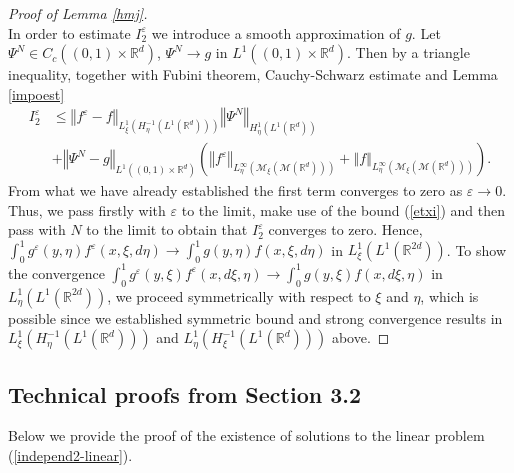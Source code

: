 \documentclass[10pt]{article}
\newcommand*{\norm}[1]{\left\Vert{#1}\right\Vert}
\newcommand{\ve}{\varepsilon}
\newcommand{\R}{\mathbb{R}}
\newcommand{\izj}{\int_{0}^{1}}
\begin{document}
\begin{proof}[Proof of Lemma \ref{hmj}]
\[\]
In order to estimate $I_2^\ve$ we introduce a smooth approximation of $g$. Let $\Psi^N \in C_c((0,1)\times \R^{d})$, $\Psi^N\rightarrow g$ in $L^{1}((0,1)\times \R^{d})$. Then by a triangle inequality, together with Fubini theorem, Cauchy-Schwarz estimate and Lemma \ref{impoest}
\begin{align*}
    I^\ve_2 &\leq \norm{f^\ve-f}_{L^{1}_\xi(H^{-1}_\eta(L^{1}(\R^d)))}\norm{\Psi^N}_{H^{1}_\eta(L^{1}(\R^{d}))}\\
    & + \norm{\Psi^N-g}_{L^{1}((0,1)\times \R^{d})} \left(\norm{f^\ve}_{L^{\infty}_\eta(\mathcal{M}_\xi(\mathcal{M}(\R^d)))} + \norm{f}_{L^{\infty}_\eta(\mathcal{M}_\xi(\mathcal{M}(\R^d)))} \right).
\end{align*}
From what we have already established the first term converges to zero as $\ve \rightarrow 0$. Thus, we pass firstly with $\ve$ to the limit, make use of the bound (\ref{etxi}) and then pass with $N$ to the limit to obtain that $I^\ve_2$ converges to zero. Hence, $\izj g^\ve(y,\eta)f^\ve(x,\xi,d\eta) \rightarrow \izj g(y,\eta)f(x,\xi,d\eta)$ in $L^{1}_\xi(L^{1}(\R^{2d}))$. To show the convergence $\izj g^\ve(y,\xi)f^\ve(x,d\xi,\eta) \rightarrow \izj g(y,\xi)f(x,d\xi,\eta)$ in $L^{1}_\eta(L^{1}(\R^{2d}))$, we proceed symmetrically with respect to $\xi$ and $\eta$, which is possible since we established symmetric bound  and strong convergence results in $L^1_\xi(H^{-1}_\eta(L^{1}(\R^d)))$ and $L^1_\eta(H^{-1}_\xi(L^{1}(\R^d)))$ above.


\end{proof}

\subsection{Technical proofs from Section 3.2 }

Below we provide the proof of the existence of solutions to the linear problem (\ref{independ2-linear}).
\end{document}
